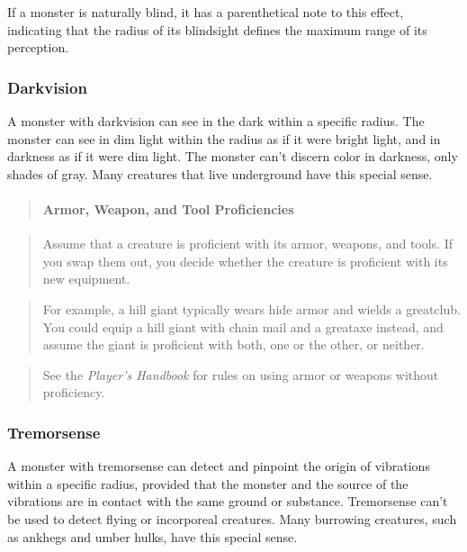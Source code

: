 \documentclass[
]{article}
\begin{document}
If a monster is naturally blind, it has a parenthetical note to this
effect, indicating that the radius of its blindsight defines the maximum
range of its perception.

\hypertarget{darkvision}{%
\subsubsection{Darkvision}\label{darkvision}}

A monster with darkvision can see in the dark within a specific radius.
The monster can see in dim light within the radius as if it were bright
light, and in darkness as if it were dim light. The monster can't
discern color in darkness, only shades of gray. Many creatures that live
underground have this special sense.

\begin{quote}
\mbox{}%
\hypertarget{armor-weapon-and-tool-proficiencies}{%
\paragraph{Armor, Weapon, and Tool
Proficiencies}\label{armor-weapon-and-tool-proficiencies}}
\end{quote}

\begin{quote}
Assume that a creature is proficient with its armor, weapons, and tools.
If you swap them out, you decide whether the creature is proficient with
its new equipment.
\end{quote}

\begin{quote}
For example, a hill giant typically wears hide armor and wields a
greatclub. You could equip a hill giant with chain mail and a greataxe
instead, and assume the giant is proficient with both, one or the other,
or neither.
\end{quote}

\begin{quote}
See the \emph{Player's Handbook} for rules on using armor or weapons
without proficiency.
\end{quote}

\hypertarget{tremorsense}{%
\subsubsection{Tremorsense}\label{tremorsense}}

A monster with tremorsense can detect and pinpoint the origin of
vibrations within a specific radius, provided that the monster and the
source of the vibrations are in contact with the same ground or
substance. Tremorsense can't be used to detect flying or incorporeal
creatures. Many burrowing creatures, such as ankhegs and umber hulks,
have this special sense.
\end{document}

